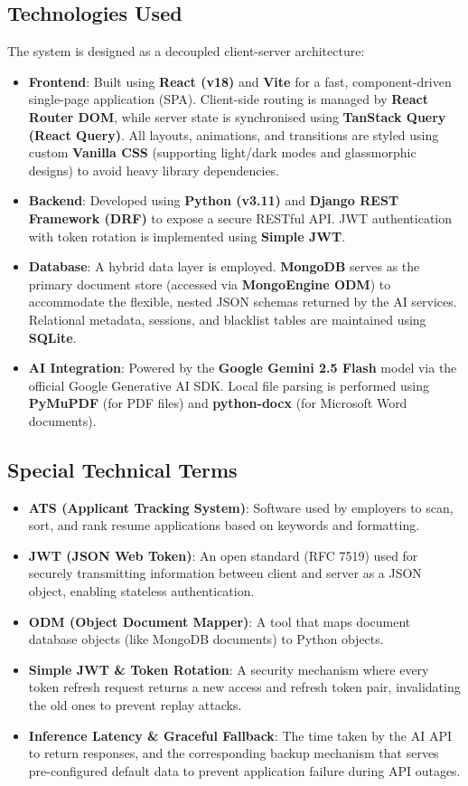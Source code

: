 \documentclass[12pt,a4paper]{article}
\begin{document}
\subsection{Technologies Used}
The system is designed as a decoupled client-server architecture:
\begin{itemize}
    \item \textbf{Frontend}: Built using \textbf{React (v18)} and \textbf{Vite} for a fast, component-driven single-page application (SPA). Client-side routing is managed by \textbf{React Router DOM}, while server state is synchronised using \textbf{TanStack Query (React Query)}. All layouts, animations, and transitions are styled using custom \textbf{Vanilla CSS} (supporting light/dark modes and glassmorphic designs) to avoid heavy library dependencies.
    \item \textbf{Backend}: Developed using \textbf{Python (v3.11)} and \textbf{Django REST Framework (DRF)} to expose a secure RESTful API. JWT authentication with token rotation is implemented using \textbf{Simple JWT}.
    \item \textbf{Database}: A hybrid data layer is employed. \textbf{MongoDB} serves as the primary document store (accessed via \textbf{MongoEngine ODM}) to accommodate the flexible, nested JSON schemas returned by the AI services. Relational metadata, sessions, and blacklist tables are maintained using \textbf{SQLite}.
    \item \textbf{AI Integration}: Powered by the \textbf{Google Gemini 2.5 Flash} model via the official Google Generative AI SDK. Local file parsing is performed using \textbf{PyMuPDF} (for PDF files) and \textbf{python-docx} (for Microsoft Word documents).
\end{itemize}

\subsection{Special Technical Terms}
\begin{itemize}
    \item \textbf{ATS (Applicant Tracking System)}: Software used by employers to scan, sort, and rank resume applications based on keywords and formatting.
    \item \textbf{JWT (JSON Web Token)}: An open standard (RFC 7519) used for securely transmitting information between client and server as a JSON object, enabling stateless authentication.
    \item \textbf{ODM (Object Document Mapper)}: A tool that maps document database objects (like MongoDB documents) to Python objects.
    \item \textbf{Simple JWT \& Token Rotation}: A security mechanism where every token refresh request returns a new access and refresh token pair, invalidating the old ones to prevent replay attacks.
    \item \textbf{Inference Latency \& Graceful Fallback}: The time taken by the AI API to return responses, and the corresponding backup mechanism that serves pre-configured default data to prevent application failure during API outages.
\end{itemize}
\end{document}
